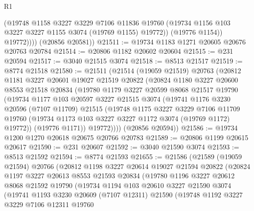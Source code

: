 \begin{lexlean}{R1}
\begin{coremodule}
                (@19748
                  @1158
                  @3227
                  @3229
                  @7106
                  @11836
                  @19760
                  (@19734 @1156 @103 @3227 @3227 @1155 @3074 (@19769 @1155) @19772))
                (@19776 @1154))
              @19772))))
      (@20856 @20581))
@21511 := @19734 @1183 @1271 @20605 @20676 @20763 @20784
@21514 := @20806 @1182 @20602 @20604
@21515 := @231 @20594
@21517 := @3040 @21515 @3074
@21518 := @8513 @21517
@21519 := @8774 @21518
@21580 := @21511
    (@21514
      (@19059 @21519)
      @20763
      (@20812
        @1181
        @3227
        @20601
        @19027
        @21519
        @20822
        (@20824
          @1180
          @3227
          @20600
          @8553
          @21518
          @20834
          (@19780
            @1179
            @3227
            @20599
            @8068
            @21517
            @19790
            (@19734
              @1177
              @103
              @20597
              @3227
              @21515
              @3074
              (@19741
                @1176
                @3230
                @20596
                (@7107 @11709)
                @21515
                (@19748
                  @1175
                  @3227
                  @3229
                  @7106
                  @11709
                  @19760
                  (@19734 @1173 @103 @3227 @3227 @1172 @3074 (@19769 @1172) @19772))
                (@19776 @1171))
              @19772))))
      (@20856 @20594))
@21586 := @19734 @1200 @1270 @20618 @20675 @20766 @20783
@21589 := @20806 @1199 @20615 @20617
@21590 := @231 @20607
@21592 := @3040 @21590 @3074
@21593 := @8513 @21592
@21594 := @8774 @21593
@21655 := @21586
    (@21589
      (@19059 @21594)
      @20766
      (@20812
        @1198
        @3227
        @20614
        @19027
        @21594
        @20822
        (@20824
          @1197
          @3227
          @20613
          @8553
          @21593
          @20834
          (@19780
            @1196
            @3227
            @20612
            @8068
            @21592
            @19790
            (@19734
              @1194
              @103
              @20610
              @3227
              @21590
              @3074
              (@19741
                @1193
                @3230
                @20609
                (@7107 @12311)
                @21590
                (@19748
                  @1192
                  @3227
                  @3229
                  @7106
                  @12311
                  @19760

\end{coremodule}
\end{lexlean}

